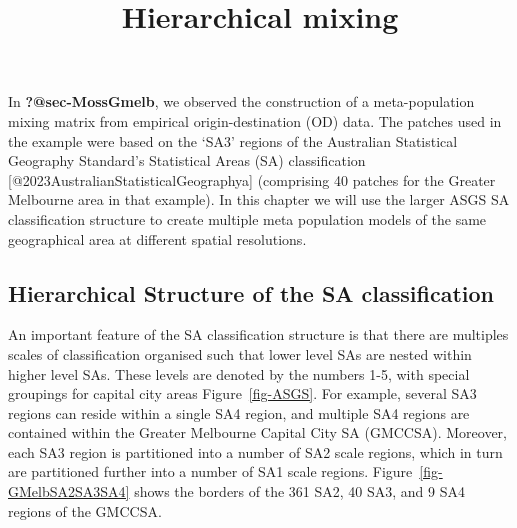 \documentclass[
  letterpaper,
  DIV=11,
  numbers=noendperiod]{scrartcl}
\title{Hierarchical mixing}
\author{}
\date{}
\begin{document}
\maketitle
\ifdefined\Shaded\renewenvironment{Shaded}{\begin{tcolorbox}[sharp corners, enhanced, interior hidden, borderline west={3pt}{0pt}{shadecolor}, frame hidden, breakable, boxrule=0pt]}{\end{tcolorbox}}\fi

In \textbf{?@sec-MossGmelb}, we observed the construction of a
meta-population mixing matrix from empirical origin-destination (OD)
data. The patches used in the example were based on the `SA3' regions of
the Australian Statistical Geography Standard's Statistical Areas (SA)
classification {[}@2023AustralianStatisticalGeographya{]} (comprising 40
patches for the Greater Melbourne area in that example). In this chapter
we will use the larger ASGS SA classification structure to create
multiple meta population models of the same geographical area at
different spatial resolutions.

\hypertarget{hierarchical-structure-of-the-sa-classification}{%
\subsection{Hierarchical Structure of the SA
classification}\label{hierarchical-structure-of-the-sa-classification}}

An important feature of the SA classification structure is that there
are multiples scales of classification organised such that lower level
SAs are nested within higher level SAs. These levels are denoted by the
numbers 1-5, with special groupings for capital city areas
Figure~\ref{fig-ASGS}. For example, several SA3 regions can reside
within a single SA4 region, and multiple SA4 regions are contained
within the Greater Melbourne Capital City SA (GMCCSA). Moreover, each
SA3 region is partitioned into a number of SA2 scale regions, which in
turn are partitioned further into a number of SA1 scale regions.
Figure~\ref{fig-GMelbSA2SA3SA4} shows the borders of the 361 SA2, 40
SA3, and 9 SA4 regions of the GMCCSA.
\end{document}
